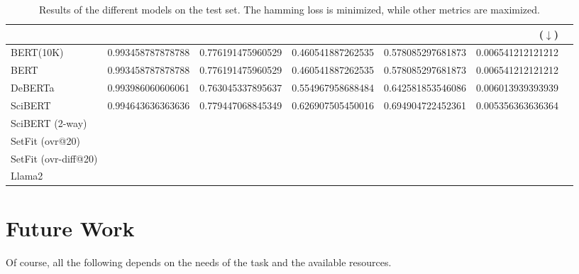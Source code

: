 \documentclass[11pt,letterpaper]{article}
\begin{document}
\begin{table}[h]
  \centering
\caption{Results of the different models on the test set. The hamming loss is minimized, while other metrics are maximized.}
  \label{tab:results}
\begin{tabular}{l|n{1}{4}n{1}{4}n{1}{4}n{1}{4}n{1}{4}n{1}{4}}
    \toprule
{} &  &  &  &  & ($\downarrow$) &  \\
    \midrule
BERT(10K) &   0.993458787878788 & 0.776191475960529 & 0.460541887262535 & 0.578085297681873 & 0.006541212121212 &  \\
BERT & 0.993458787878788	& 0.776191475960529& 	0.460541887262535& 	0.578085297681873& 0.006541212121212 	 & \\
DeBERTa   & 0.993986060606061	 & 0.763045337895637 & 	0.554967958688484	 & 0.642581853546086	 & 0.006013939393939 & \\
SciBERT 	 & {\npboldmath}0.994643636363636 & {\npboldmath}0.779447068845349	 &	{\npboldmath}0.626907505450016		 & {\npboldmath} 0.694904722452361		 & {\npboldmath}0.005356363636364 	 &\\
SciBERT (2-way) 	 & \\
SetFit (ovr@20)                                               \\
SetFit (ovr-diff@20)                                               \\
Llama2                                                \\
    \bottomrule
  \end{tabular}
\end{table}

\section{Future Work}

Of course, all the following depends on the needs of the task and the available resources.
\end{document}
